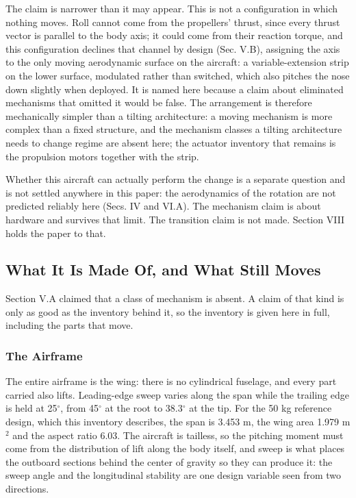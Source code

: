 \documentclass[journal]{new-aiaa}
\begin{document}
The claim is narrower than it may appear. This is not a configuration in which nothing moves. Roll cannot come from the propellers' thrust, since every thrust vector is parallel to the body axis; it could come from their reaction torque, and this configuration declines that channel by design (Sec. V.B), assigning the axis to the only moving aerodynamic surface on the aircraft: a variable-extension strip on the lower surface, modulated rather than switched, which also pitches the nose down slightly when deployed. It is named here because a claim about eliminated mechanisms that omitted it would be false. The arrangement is therefore mechanically simpler than a tilting architecture: a moving mechanism is more complex than a fixed structure, and the mechanism classes a tilting architecture needs to change regime are absent here; the actuator inventory that remains is the propulsion motors together with the strip.

Whether this aircraft can actually perform the change is a separate question and is not settled anywhere in this paper: the aerodynamics of the rotation are not predicted reliably here (Secs. IV and VI.A). The mechanism claim is about hardware and survives that limit. The transition claim is not made. Section VIII holds the paper to that.

\subsection{What It Is Made Of, and What Still Moves}

Section V.A claimed that a class of mechanism is absent. A claim of that kind is only as good as the inventory behind it, so the inventory is given here in full, including the parts that move.

\subsubsection{The Airframe}

The entire airframe is the wing: there is no cylindrical fuselage, and every part carried also lifts. Leading-edge sweep varies along the span while the trailing edge is held at 25$^\circ$, from 45$^\circ$ at the root to 38.3$^\circ$ at the tip. For the 50 kg reference design, which this inventory describes, the span is 3.453 m, the wing area 1.979 m$^2$ and the aspect ratio 6.03. The aircraft is tailless, so the pitching moment must come from the distribution of lift along the body itself, and sweep is what places the outboard sections behind the center of gravity so they can produce it: the sweep angle and the longitudinal stability are one design variable seen from two directions.
\end{document}
